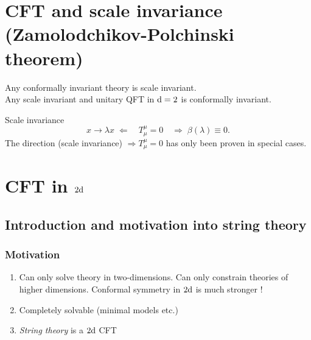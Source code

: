  	\section{CFT and scale invariance (Zamolodchikov-Polchinski theorem)}
 	\begin{mybox}{}
 		Any conformally invariant theory is scale invariant.\\
 		Any scale invariant and unitary QFT in $\mathrm{d}=2$ is conformally invariant.
 	\end{mybox}
 	Scale invariance
 	\begin{equation}
 	x \rightarrow \lambda x \; \Leftarrow \quad T^\mu_\mu =0 \quad \Rightarrow \; \beta(\lambda) \equiv 0.
 	\end{equation}
 	The direction (scale invariance) $\Rightarrow T^\mu_\mu=0$ has only been proven in special cases.
 	
 	\section{CFT in $2 \mathrm{d}$ }
 	
 \subsection{Introduction and motivation into string theory}
 	\subsubsection{Motivation}
 	
 \begin{enumerate}
 	\item Can only solve theory in two-dimensions. Can only constrain theories of higher dimensions. Conformal symmetry in $2\mathrm{d}$ is much stronger !
 	\item Completely solvable (minimal models etc.) 
 	\item \emph{String theory} is a $2 \mathrm{d}$ CFT
 \end{enumerate}
